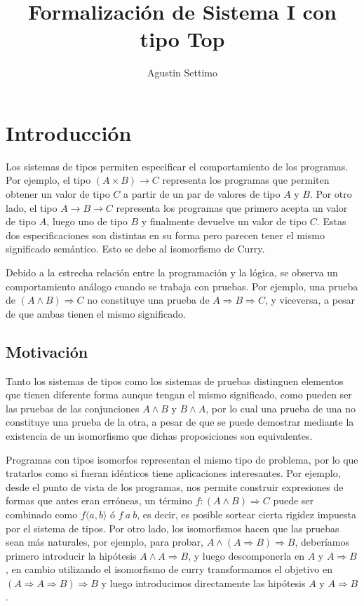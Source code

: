 \documentclass[]{report}
\title{Formalización de Sistema I con tipo Top}
\author{Agustin Settimo}
\begin{document}
\maketitle
\tableofcontents

\begin{abstract}

\end{abstract}


\chapter{Introducción}

Los sistemas de tipos permiten especificar el comportamiento de los programas. Por ejemplo, el tipo $(A \times B) \rightarrow C$ representa los programas que permiten obtener un valor de tipo $C$ a partir de un par de valores de tipo $A$ y $B$. Por otro lado, el tipo $A \rightarrow B \rightarrow C$ representa los programas que primero acepta un valor de tipo $A$, luego uno de tipo $B$ y finalmente devuelve un valor de tipo $C$. Estas dos especificaciones son distintas en su forma pero parecen tener el mismo significado semántico. Esto se debe al isomorfismo de Curry.

Debido a la estrecha relación entre la programación y la lógica, se observa un comportamiento análogo cuando se trabaja con pruebas. Por ejemplo, una prueba de $(A \wedge B) \Rightarrow C$ no constituye una prueba de $A \Rightarrow B \Rightarrow C$, y viceversa, a pesar de que ambas tienen el mismo significado.

\section{Motivación}

Tanto los sistemas de tipos como los sistemas de pruebas distinguen elementos que tienen diferente forma aunque tengan el mismo significado, como pueden ser las pruebas de las conjunciones $A \wedge B$ y $B \wedge A$, por lo cual una prueba de una no constituye una prueba de la otra, a pesar de que se puede demostrar mediante la existencia de un isomorfismo que dichas proposiciones son equivalentes.

Programas con tipos isomorfos representan el mismo tipo de problema, por lo que tratarlos como si fueran idénticos tiene aplicaciones interesantes. Por ejemplo, desde el punto de vista de los programas, nos permite construir expresiones de formas que antes eran erróneas, un término $f : (A \wedge B) \Rightarrow C$ puede ser combinado como $f \langle a, b \rangle$ ó $f \: a \: b$, es decir, es posible sortear cierta rigidez impuesta por el sistema de tipos.
Por otro lado, los isomorfismos hacen que las pruebas sean más naturales, por ejemplo, para probar, $A \wedge (A \Rightarrow  B) \Rightarrow B$, deberíamos primero introducir la hipótesis $A \wedge A \Rightarrow  B$, y luego descomponerla en $A$ y $A \Rightarrow B$, en cambio utilizando el isomorfismo de curry transformamos el objetivo en $(A \Rightarrow A \Rightarrow  B) \Rightarrow B$ y luego introducimos directamente las hipótesis $A$ y $A \Rightarrow B$.
\end{document}
